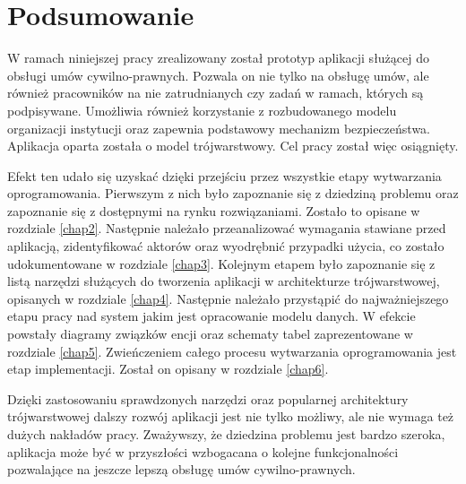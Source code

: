 \chapter{Podsumowanie}
W ramach niniejszej pracy zrealizowany został prototyp aplikacji służącej do obsługi umów cywilno-prawnych. Pozwala on nie tylko na obsługę umów, ale również pracowników na nie zatrudnianych czy zadań w ramach, których są podpisywane. Umożliwia również korzystanie z rozbudowanego modelu organizacji instytucji oraz zapewnia podstawowy mechanizm bezpieczeństwa. Aplikacja oparta została o model trójwarstwowy. Cel pracy został więc osiągnięty.

Efekt ten udało się uzyskać dzięki przejściu przez wszystkie etapy wytwarzania oprogramowania. Pierwszym z nich było zapoznanie się z dziedziną problemu oraz zapoznanie się z dostępnymi na rynku rozwiązaniami. Zostało to opisane w rozdziale \ref{chap2}. Następnie należało przeanalizować wymagania stawiane przed aplikacją, zidentyfikować aktorów oraz wyodrębnić przypadki użycia, co zostało udokumentowane w rozdziale \ref{chap3}. Kolejnym etapem było zapoznanie się z listą narzędzi służących do tworzenia aplikacji w architekturze trójwarstwowej, opisanych w rozdziale \ref{chap4}. Następnie należało przystąpić do najważniejszego etapu pracy nad system jakim jest opracowanie modelu danych. W efekcie powstały diagramy związków encji oraz schematy tabel zaprezentowane w rozdziale \ref{chap5}. Zwieńczeniem całego procesu wytwarzania oprogramowania jest etap implementacji. Został on opisany w rozdziale \ref{chap6}.
	
Dzięki zastosowaniu sprawdzonych narzędzi oraz popularnej architektury trójwarstwowej dalszy rozwój aplikacji jest nie tylko możliwy, ale nie wymaga też dużych nakładów pracy. Zważywszy, że dziedzina problemu jest bardzo szeroka, aplikacja może być w przyszłości wzbogacana o kolejne funkcjonalności pozwalające na jeszcze lepszą obsługę umów cywilno-prawnych.
